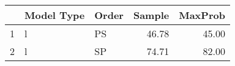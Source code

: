 \begin{tabular}{rllrr}
  \hline
 & Model Type & Order & Sample & MaxProb \\ 
  \hline
1 & l & PS & 46.78 & 45.00 \\ 
  2 & l & SP & 74.71 & 82.00 \\ 
   \hline
\end{tabular}
